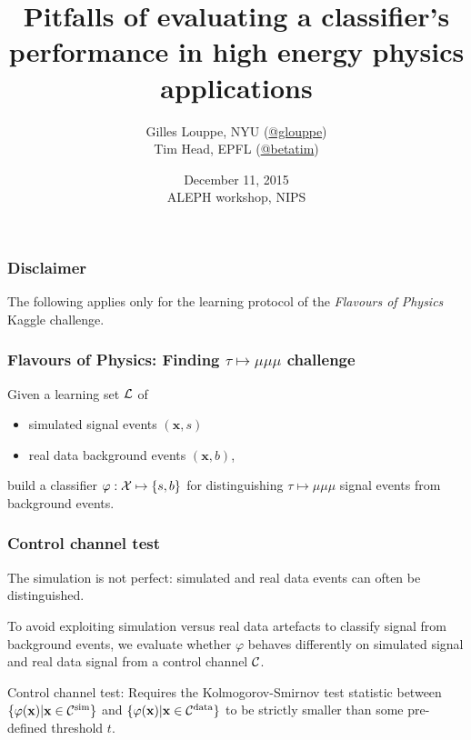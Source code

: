 \documentclass{beamer}
\title{{\bf Pitfalls of evaluating a classifier's performance in high energy physics applications}}
\author{
Gilles Louppe, NYU (\href{https://twitter.com/glouppe}{@glouppe}) \\
Tim Head, EPFL (\href{https://twitter.com/betatim}{@betatim}) \\
}
\date{December 11, 2015\\
ALEPH workshop, NIPS}
\begin{document}
\begin{frame}[plain]
\titlepage
\end{frame}

\begin{frame}
  \frametitle{Disclaimer}

The following applies {\color{red} only} for the learning protocol of the {\it
Flavours of Physics} Kaggle challenge.

\end{frame}

\begin{frame}
  \frametitle{Flavours of Physics: Finding $\tau \mapsto \mu\mu\mu$ challenge}

Given a learning set ${\cal L}$ of

\vspace{0.5cm}

 \begin{itemize}
 \item simulated signal events $(\mathbf{x}, s)$
 \item real data background events $(\mathbf{x}, b)$,
 \end{itemize}

\vspace{0.5cm}

build a classifier $\varphi : {\cal X} \mapsto \{s, b\}$ for distinguishing
$\tau \mapsto \mu\mu\mu$ signal events from background events.

\end{frame}

\begin{frame}
  \frametitle{Control channel test}

The simulation is not perfect: {\color{red} simulated and real data events can often be distinguished}.

\vspace{1cm}

To avoid exploiting simulation versus real data artefacts to
classify signal from background events, we {\color{blue}evaluate whether $\varphi$ behaves
differently on simulated signal and real data signal from a control channel
${\cal C}$}.

\vspace{1cm}

Control channel test: Requires the Kolmogorov-Smirnov
test statistic between $\{ \varphi(\mathbf{x}) | \mathbf{x} \in {\cal
C}^\text{sim} \}$ and $\{ \varphi(\mathbf{x}) | \mathbf{x} \in {\cal
C}^\text{data} \}$ to be strictly smaller than some pre-defined threshold $t$.

\end{frame}
\end{document}
